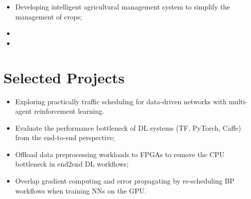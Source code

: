 \documentclass{resume}
\begin{document}
\begin{itemize}
	\item Developing intelligent agricultural management system to simplify the management of crops;
\end{itemize}

\begin{itemize}
	\item {}
	\item {}
\end{itemize}


\section{Selected Projects}
\begin{itemize}
	\item Exploring practically traffic scheduling for data-driven networks with multi-agent reinforcement learning.
\end{itemize}

\begin{itemize}
	\item Evaluate the performance bottleneck of DL systems (TF, PyTorch, Caffe) from the end-to-end perspective;
	\item Offload data preprocessing workloads to FPGAs to remove the CPU bottleneck in end2end DL workflows;
	\item Overlap gradient computing and error propagating by re-scheduling BP workflows when training NNs on the GPU.
\end{itemize}
\end{document}
